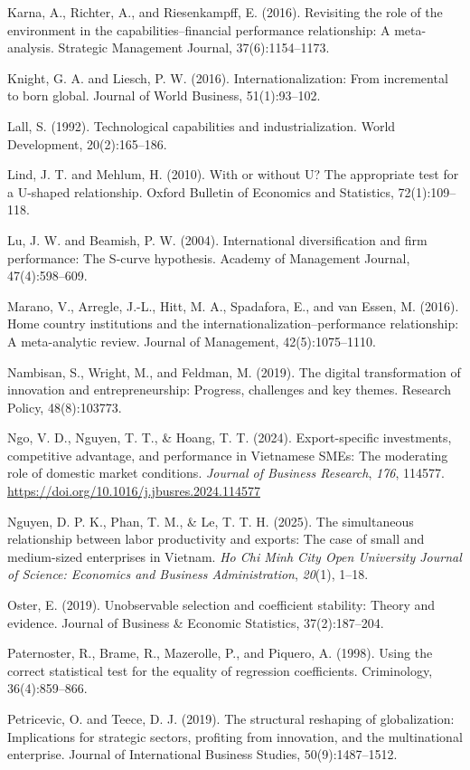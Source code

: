 \documentclass[12pt,a4paper]{article}
\begin{document}
Karna, A., Richter, A., and Riesenkampff, E. (2016). Revisiting the role
of the environment in the capabilities--financial performance
relationship: A meta-analysis. Strategic Management Journal,
37(6):1154--1173.

Knight, G. A. and Liesch, P. W. (2016). Internationalization: From
incremental to born global. Journal of World Business, 51(1):93--102.

Lall, S. (1992). Technological capabilities and industrialization. World
Development, 20(2):165--186.

Lind, J. T. and Mehlum, H. (2010). With or without U? The appropriate
test for a U-shaped relationship. Oxford Bulletin of Economics and
Statistics, 72(1):109--118.

Lu, J. W. and Beamish, P. W. (2004). International diversification and
firm performance: The S-curve hypothesis. Academy of Management Journal,
47(4):598--609.

Marano, V., Arregle, J.-L., Hitt, M. A., Spadafora, E., and van Essen,
M. (2016). Home country institutions and the
internationalization--performance relationship: A meta-analytic review.
Journal of Management, 42(5):1075--1110.

Nambisan, S., Wright, M., and Feldman, M. (2019). The digital
transformation of innovation and entrepreneurship: Progress, challenges
and key themes. Research Policy, 48(8):103773.

Ngo, V. D., Nguyen, T. T., \& Hoang, T. T. (2024). Export-specific
investments, competitive advantage, and performance in Vietnamese SMEs:
The moderating role of domestic market conditions. \emph{Journal of
Business Research}, \emph{176}, 114577.
\url{https://doi.org/10.1016/j.jbusres.2024.114577}

Nguyen, D. P. K., Phan, T. M., \& Le, T. T. H. (2025). The simultaneous
relationship between labor productivity and exports: The case of small
and medium-sized enterprises in Vietnam. \emph{Ho Chi Minh City Open
University Journal of Science: Economics and Business Administration},
\emph{20}(1), 1--18.

Oster, E. (2019). Unobservable selection and coefficient stability:
Theory and evidence. Journal of Business \& Economic Statistics,
37(2):187--204.

Paternoster, R., Brame, R., Mazerolle, P., and Piquero, A. (1998). Using
the correct statistical test for the equality of regression
coefficients. Criminology, 36(4):859--866.

Petricevic, O. and Teece, D. J. (2019). The structural reshaping of
globalization: Implications for strategic sectors, profiting from
innovation, and the multinational enterprise. Journal of International
Business Studies, 50(9):1487--1512.
\end{document}

